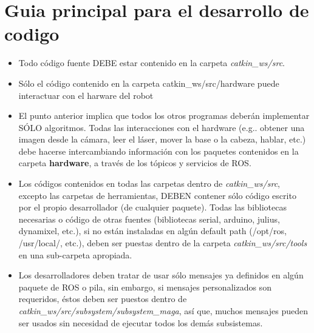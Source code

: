 \documentclass[user_manual.tex]{subfiles}
\begin{document}
\section{Guia principal para el desarrollo de codigo}
\begin{itemize}
 \item Todo código fuente DEBE estar contenido en la carpeta \textit{catkin\_ws/src}.\\
 
 \item Sólo el código contenido en la carpeta catkin\_ws/src/hardware puede interactuar con el 
 harware del robot\\
 
 \item El punto anterior implica que todos los otros programas deberán implementar SÓLO algoritmos. 
 Todas las interacciones con el hardware (e.g.. obtener una imagen desde la cámara, leer el láser, 
 mover la base o la cabeza, hablar, etc.) debe hacerse intercambiando información con los paquetes
 contenidos en la carpeta \textbf{hardware}, a través de los tópicos y servicios de ROS.
 
 \item Los códigos contenidos en todas las carpetas dentro de \textit{catkin\_ws/src}, excepto las carpetas de 
 herramientas, DEBEN contener sólo código escrito por el propio desarrollador (de cualquier paquete).
 Todas las bibliotecas necesarias o código de otras fuentes (bibliotecas serial, arduino, julius,
 dynamixel, etc.), si no están instaladas en algún default path (/opt/ros, /usr/local/, etc.), deben 
 ser puestas dentro de la carpeta \textit{catkin\_ws/src/tools} en una sub-carpeta apropiada.\\
 
 \item Los desarrolladores deben tratar de usar sólo mensajes ya definidos en algún paquete de ROS o
 pila, sin embargo, si mensajes personalizados son requeridos, éstos deben ser puestos dentro de
 \textit{catkin\_ws/src/subsystem/subsystem\_maga}, así que, muchos mensajes pueden ser usados sin necesidad
 de ejecutar todos los demás subsistemas.\\
\end{itemize}
\end{document}
